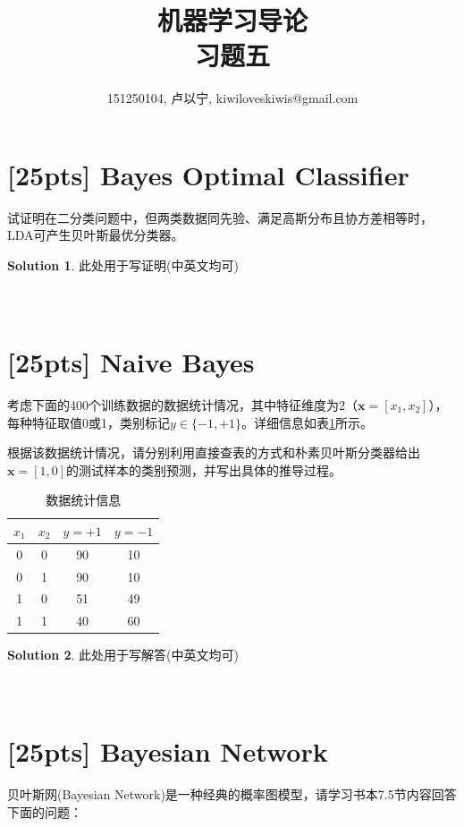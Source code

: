 \documentclass[a4paper,UTF8]{article}
\numberwithin{equation}{section}
\theoremstyle{definition}
\newtheorem*{solution}{Solution}
\begin{document}
\title{机器学习导论\\
习题五}
\author{151250104, 卢以宁,  kiwiloveskiwis@gmail.com}
\maketitle
\section{[25pts] Bayes Optimal Classifier}
试证明在二分类问题中，但两类数据同先验、满足高斯分布且协方差相等时，LDA可产生贝叶斯最优分类器。
\begin{solution}
此处用于写证明(中英文均可)
~\\
~\\
~\\
\end{solution}

\section{[25pts] Naive Bayes}
考虑下面的400个训练数据的数据统计情况，其中特征维度为2（$\mathbf{x}=[x_1,x_2]$），每种特征取值0或1，类别标记$y\in\{-1,+1\}$。详细信息如表\ref{table:training}所示。

根据该数据统计情况，请分别利用直接查表的方式和朴素贝叶斯分类器给出$\mathbf{x}=[1,0]$的测试样本的类别预测，并写出具体的推导过程。
\begin{table}[h]
\centering
\caption{数据统计信息}
\label{table:training}\vspace{2mm}
\begin{tabular}{cc|cc}\hline
$x_1$		&  $x_2$ 	&	$y=+1$	&	$y=-1$ 	\\ \hline
0		&  0 	&	90	&	10 \\
0		&  1 	&	90 	&	10 \\
1		&  0 	&	51 	&	49 \\
1		&  1 	&	40 	&	60 \\\hline
\end{tabular}
\end{table}

\begin{solution}
此处用于写解答(中英文均可)
~\\
~\\
~\\
\end{solution}

\section{\textbf{[25pts]} Bayesian Network}
贝叶斯网(Bayesian Network)是一种经典的概率图模型，请学习书本7.5节内容回答下面的问题：
\end{document}

